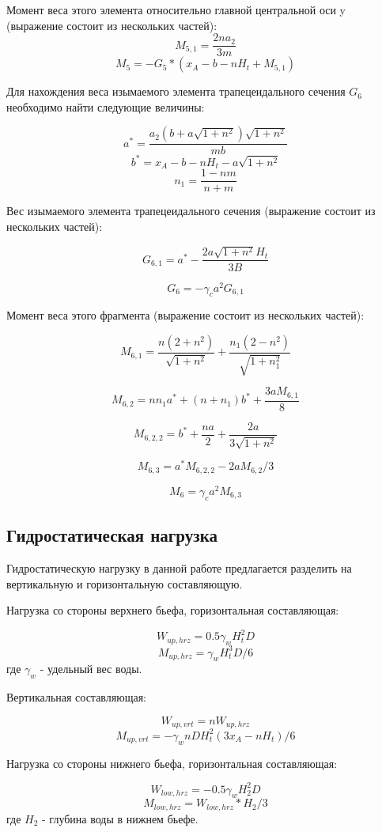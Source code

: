\documentclass[12pt,a4paper,oneside,draft,titlepage]{article}
\begin{document}
Момент веса этого элемента относительно главной центральной оси y (выражение состоит из нескольких частей):
$$ M_{5,1} = \frac{2  n  a_2 }{ 3  m} $$
$$ M_5 = -G_5 * (x_A - b - n  H_t + M_{5,1}) $$

Для нахождения веса изымаемого элемента трапецеидального сечения $G_6$ необходимо найти следующие величины:

$$ a^* = \frac{a_2  (b + a  \sqrt{1 + n ^ 2})  \sqrt{1 + n ^ 2}} {m  b} $$
$$ b^* = x_A - b - n  H_t - a  \sqrt{1 + n ^ 2} $$
$$ n_1 = \frac {1 - n  m}{n + m} $$

Вес изымаемого элемента трапецеидального сечения (выражение состоит из нескольких частей):

$$ G_{6,1} = a^* - \frac{2  a  \sqrt{1 + n ^ 2}  H_t} { 3  B} $$
 
$$ G_6 = -\gamma_c  a ^ 2  G_{6,1} $$

Момент веса этого фрагмента (выражение состоит из нескольких частей):

$$ M_{6,1} = \frac{n  (2 + n ^ 2)}{\sqrt{1 + n ^ 2}} + \frac{n_1  (2 - n ^ 2)}{ \sqrt{1 + n_1 ^ 2}} $$

$$ M_{6,2} = n  n_1  a^* + (n + n_1)  b^* + \frac{3  a  M_{6,1}}{8} $$

$$ M_{6,2,2} = b^* + \frac{n  a}{2} + \frac{2  a} { 3  \sqrt{1 + n ^ 2}} $$

$$ M_{6,3} = a^*  M_{6,2,2} - 2  a  M_{6,2} / 3 $$

$$ M_6 = \gamma_c  a ^ 2  M_{6,3} $$

\subsection{Гидростатическая нагрузка}

Гидростатическую нагрузку в данной работе предлагается разделить на вертикальную и горизонтальную составляющую.

Нагрузка со стороны верхнего бьефа, горизонтальная составляющая:

$$ W_{up,hrz} = 0.5  \gamma_w  H_t ^ 2  D $$
$$ M_{up,hrz} = \gamma_w  H_t ^ 3  D / 6 $$
где $\gamma_w$ - удельный вес воды.

Вертикальная составляющая:

$$ W_{up,vrt} = n  W_{up,hrz} $$
$$ M_{up,vrt} = -\gamma_w  n  D  H_t ^ 2  (3  x_A - n  H_t) / 6 $$

Нагрузка со стороны нижнего бьефа, горизонтальная составляющая:

$$ W_{low,hrz} = -0.5  \gamma_w  H_2 ^ 2  D $$
$$ M_{low,hrz} = W_{low,hrz} * H_2 / 3 $$
где $H_2$ - глубина воды в нижнем бьефе.
\end{document}
